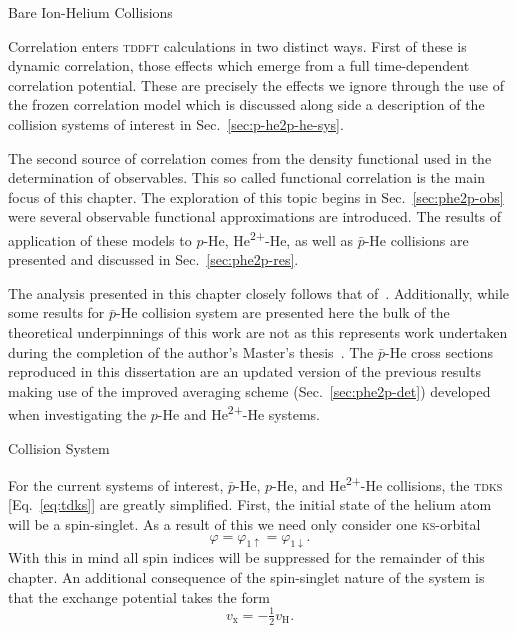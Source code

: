 \documentclass[letterpaper, 11 pt]{report}
\begin{document}
\begin{chapter}{Bare Ion-Helium Collisions \label{chap:p-he2p-he}}

   Correlation enters \textsc{tddft} calculations in two distinct ways. First of these is dynamic
   correlation, those effects which emerge from a full time-dependent correlation potential. These are
   precisely the effects we ignore through the use of the frozen correlation model which is discussed
   along side a description of the collision systems of interest in Sec.~\ref{sec:p-he2p-he-sys}.

   The second source of correlation comes from the density functional
   used in the determination of observables. This so called functional correlation is the main focus of
   this chapter. The exploration of this topic begins in Sec.~\ref{sec:phe2p-obs} were several
   observable functional approximations are introduced. The results of application of these models to
   $p$-He, He\textsuperscript{2+}-He, as well as $\bar{p}$-He collisions are presented and discussed in
   Sec.~\ref{sec:phe2p-res}.

   The analysis presented in this chapter closely follows that of~\cite{p-he2p-he}. Additionally, while
   some results for $\bar{p}$-He collision system are presented here the bulk of the theoretical
   underpinnings of this work are not as this represents work undertaken during the completion of the
   author's Master's thesis~\cite{thesis}. The $\bar{p}$-He cross sections reproduced in this
   dissertation are an updated version of the previous results making use of the improved averaging
   scheme (Sec.~\ref{sec:phe2p-det}) developed when investigating the $p$-He and
   He\textsuperscript{2+}-He systems.

   \begin{section}{Collision System \label{sec:p-he2p-he-sys}}

      For the current systems of interest, $\bar{p}$-He, $p$-He, and He\textsuperscript{2+}-He
      collisions, the \textsc{tdks} [Eq.~\eqref{eq:tdks}] are greatly simplified. First, the initial
      state of the helium atom will be a spin-singlet. As a result of this we need only consider one
      \textsc{ks}-orbital
      \begin{equation} \label{eq:oneorb}
         \varphi = \varphi_{1\uparrow} = \varphi_{1\downarrow}.
      \end{equation}
      With this in mind all spin indices will be suppressed for the remainder of this chapter. An
      additional consequence of the spin-singlet nature of the system is that the exchange potential
      takes the form
      \begin{equation} \label{eq:vxvh}
         v_\mathrm{x} = - \tfrac{1}{2} v_\mathrm{H}.
      \end{equation}


\end{section}
\end{chapter}
\end{document}
